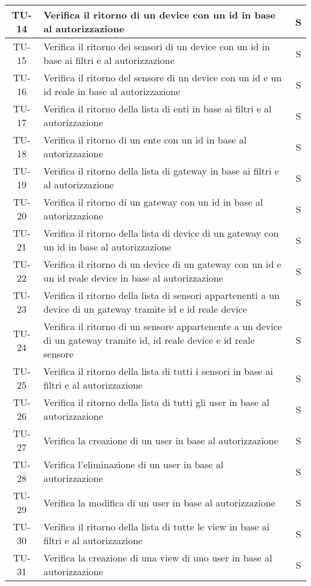 \begin{center}
\begin{longtable}{|c|p{12cm}|c|}
			\hline
			TU-14 & Verifica il ritorno di un device con un id in base al autorizzazione & S \\
			\hline
			TU-15 & Verifica il ritorno dei sensori di un device con un id in base ai filtri e al autorizzazione & S \\
			\hline
			TU-16 & Verifica il ritorno del sensore di un device con un id e un id reale in base al autorizzazione & S \\
			\hline
			TU-17 & Verifica il ritorno della lista di enti in base ai filtri e al autorizzazione & S \\
			\hline
			TU-18 & Verifica il ritorno di un ente con un id in base al autorizzazione & S \\
			\hline
			TU-19 & Verifica il ritorno della lista di gateway in base ai filtri e al autorizzazione & S \\
			\hline
			TU-20 & Verifica il ritorno di un gateway con un id in base al autorizzazione & S \\
			\hline
			TU-21 & Verifica il ritorno della lista di device di un gateway con un id in base al autorizzazione & S \\
			\hline
			TU-22 & Verifica il ritorno di un device di un gateway con un id e un id reale device in base al autorizzazione & S \\
			\hline
			TU-23 & Verifica il ritorno della lista di sensori appartenenti a un device di un gateway tramite id e id reale device & S \\
			\hline
			TU-24 & Verifica il ritorno di un sensore appartenente a un device di un gateway tramite id, id reale device e id reale sensore & S \\
			\hline
			TU-25 & Verifica il ritorno della lista di tutti i sensori in base ai filtri e al autorizzazione & S \\
			\hline
			TU-26 & Verifica il ritorno della lista di tutti gli user in base al autorizzazione & S \\
			\hline
			TU-27 & Verifica la creazione di un user in base al autorizzazione & S \\
			\hline
			TU-28 & Verifica l'eliminazione di un user in base al autorizzazione & S \\
			\hline
			TU-29 & Verifica la modifica di un user in base al autorizzazione & S \\
			\hline
			TU-30 & Verifica il ritorno della lista di tutte le view in base ai filtri e al autorizzazione & S \\
			\hline
			TU-31 & Verifica la creazione di una view di uno user in base al autorizzazione & S \\

\end{longtable}
\end{center}
